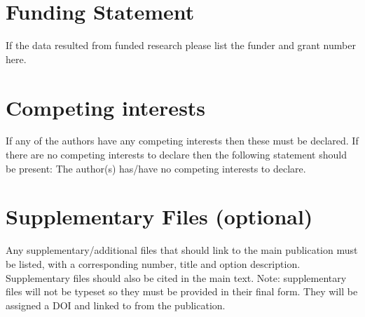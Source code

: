 \documentclass{article}
\begin{document}
\section*{Funding Statement}
If the data resulted from funded research please list the funder and grant number here.

\section*{Competing interests} 
If any of the authors have any competing interests then these must be declared. If there are no competing interests to declare then the following statement should be present: The author(s) has/have no competing interests to declare.




\section*{Supplementary Files (optional)}
Any supplementary/additional files that should link to the main publication must be listed, with a corresponding number, title and option description. Supplementary files should also be cited in the main text.
Note: supplementary files will not be typeset so they must be provided in their final form. They will be assigned a DOI and linked to from the publication.
\end{document}
